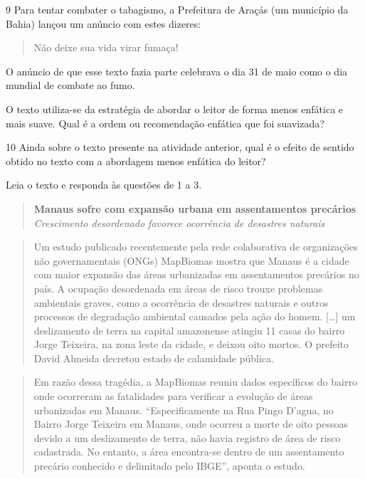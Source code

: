 \num{9} Para tentar combater o tabagismo, a Prefeitura de Araçás (um
município da Bahia) lançou um anúncio com estes dizeres:

\begin{quote}
Não deixe sua vida virar fumaça!
\end{quote}

O anúncio de que esse texto fazia parte celebrava o dia 31 de maio como
o dia mundial de combate ao fumo.

O texto utiliza-se da estratégia de abordar o leitor de forma menos
enfática e mais suave. Qual é a ordem ou recomendação enfática que foi
suavizada?


\num{10} Ainda sobre o texto presente na atividade anterior, qual é o
efeito de sentido obtido no texto com a abordagem menos enfática do
leitor?



Leia o texto e responda às questões de 1 a 3.

\begin{quote}
\textbf{Manaus sofre com expansão urbana em assentamentos precários}
\emph{Crescimento desordenado favorece ocorrência de desastres naturais}
\end{quote}

\begin{quote}
Um estudo publicado recentemente pela rede colaborativa de organizações
não governamentais (ONGs) MapBiomas mostra que Manaus é a cidade com
maior expansão das áreas urbanizadas em assentamentos precários no país.
A ocupação desordenada em áreas de risco trouxe problemas ambientais
graves, como a ocorrência de desastres naturais e outros processos de
degradação ambiental causados pela ação do homem. {[}\ldots{]} um
deslizamento de terra na capital amazonense atingiu 11 casas do bairro
Jorge Teixeira, na zona leste da cidade, e deixou oito mortos. O
prefeito David Almeida decretou estado de calamidade pública.
\end{quote}

\begin{quote}
Em razão dessa tragédia, a MapBiomas reuniu dados específicos do bairro
onde ocorreram as fatalidades para verificar a evolução de áreas
urbanizadas em Manaus. ``Especificamente na Rua Pingo D'agua, no Bairro
Jorge Teixeira em Manaus, onde ocorreu a morte de oito pessoas devido a
um deslizamento de terra, não havia registro de área de risco
cadastrada. No entanto, a área encontra-se dentro de um assentamento
precário conhecido e delimitado pelo IBGE'', aponta o estudo.
\end{quote}

